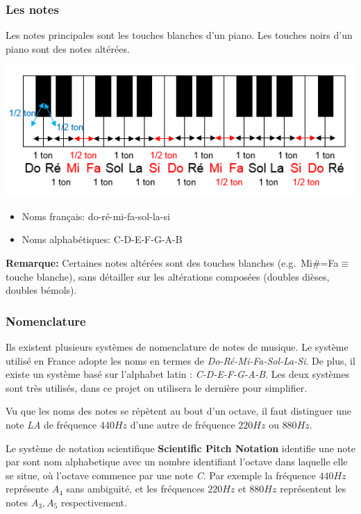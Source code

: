 \documentclass[]{article}
\providecommand{\tightlist}{%
  \setlength{\itemsep}{0pt}\setlength{\parskip}{0pt}}
\begin{document}
\hypertarget{les-notes}{%
\subsubsection{Les notes}\label{les-notes}}

Les notes principales sont les touches blanches d'un piano. Les touches
noirs d'un piano sont des notes altérées.

\includegraphics{img/intervalles-piano.png}

\begin{itemize}
\tightlist
\item
  Noms français: do-ré-mi-fa-sol-la-si
\item
  Noms alphabétiques: C-D-E-F-G-A-B
\end{itemize}

\textbf{Remarque:} Certaines notes altérées sont des touches blanches
(e.g.~Mi\#=Fa\(\equiv\)touche blanche), sans détailler sur les
altérations composées (doubles dièses, doubles bémols).

\hypertarget{nomenclature}{%
\subsubsection{Nomenclature}\label{nomenclature}}

Ils existent plusieurs systèmes de nomenclature de notes de musique. Le
système utilisé en France adopte les noms en termes de
\emph{Do-Ré-Mi-Fa-Sol-La-Si}. De plus, il existe un système basé sur
l'alphabet latin : \emph{C-D-E-F-G-A-B}. Les deux systèmes sont très
utilisés, dans ce projet on utilisera le dernière pour simplifier.

Vu que les noms des notes se répètent au bout d'un octave, il faut
distinguer une note \emph{LA} de fréquence \(440Hz\) d'une autre de
fréquence \(220Hz\) ou \(880Hz\).

Le système de notation scientifique \textbf{Scientific Pitch Notation}
identifie une note par sont nom alphabetique avec un nombre identifiant
l'octave dans laquelle elle se situe, où l'octave commence par une note
\emph{C}. Par exemple la fréquence \(440Hz\) représente \(A_4\) sans
ambiguité, et les fréquences \(220Hz\) et \(880Hz\) représentent les
notes \(A_3, A_5\) respectivement.
\end{document}
